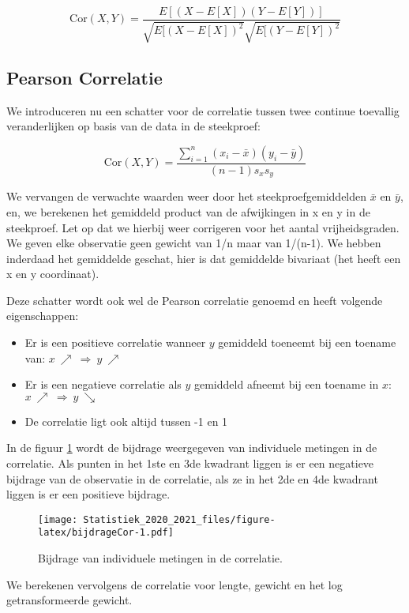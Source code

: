 \documentclass[
  12pt,dutch,coursenotes]{book}
\theoremstyle{definition}
\theoremstyle{definition}
\theoremstyle{definition}
\theoremstyle{remark}
\begin{document}
\[\mbox{Cor}(X,Y)=\frac{E[(X-E[X])(Y-E[Y])]}{\sqrt{E[(X-E[X])^2}\sqrt{E[(Y-E[Y])^2}}\]

\hypertarget{pearson-correlatie}{%
\subsection{Pearson Correlatie}\label{pearson-correlatie}}

We introduceren nu een schatter voor de correlatie tussen twee continue toevallig veranderlijken op basis van de data in de steekproef:

\[
\mbox{Cor}(X,Y)=\frac{\sum_{i=1}^{n}(x_{i}-\bar{x})(y_{i}-\bar{y})}{(n-1)s_{x}s_{y}}
\]

We vervangen de verwachte waarden weer door het steekproefgemiddelden \(\bar x\) en \(\bar y\), en, we berekenen het gemiddeld product van de afwijkingen in x en y in de steekproef. Let op dat we hierbij weer corrigeren voor het aantal vrijheidsgraden. We geven elke observatie geen gewicht van 1/n maar van 1/(n-1). We hebben inderdaad het gemiddelde geschat, hier is dat gemiddelde bivariaat (het heeft een x en y coordinaat).

Deze schatter wordt ook wel de Pearson correlatie genoemd en heeft volgende eigenschappen:

\begin{itemize}
\item
  Er is een positieve correlatie wanneer \(y\) gemiddeld toeneemt bij een toename van: \(x \ \nearrow \ \Rightarrow \ y \ \nearrow\)
\item
  Er is een negatieve correlatie als \(y\) gemiddeld afneemt bij een toename in \(x\): \(x \ \nearrow \ \Rightarrow \ y \ \searrow\)
\item
  De correlatie ligt ook altijd tussen -1 en 1
\end{itemize}

In de figuur \ref{fig:bijdrageCor} wordt de bijdrage weergegeven van individuele metingen in de correlatie. Als punten in het 1ste en 3de kwadrant liggen is er een negatieve bijdrage van de observatie in de correlatie, als ze in het 2de en 4de kwadrant liggen is er een positieve bijdrage.

\begin{figure}
\centering
\texttt{[image: Statistiek\_2020\_2021\_files/figure-latex/bijdrageCor-1.pdf]}
\caption{\label{fig:bijdrageCor}Bijdrage van individuele metingen in de correlatie.}
\end{figure}

We berekenen vervolgens de correlatie voor lengte, gewicht en het log getransformeerde gewicht.
\end{document}
